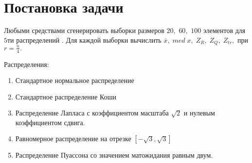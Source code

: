 \documentclass[a4]{article}
\renewcommand{\listoftables}{\begingroup %
\tocsection
\tocfile{\listtablename}{lot}
\endgroup}
\begin{document}
\newpage
\pagestyle{plain}




\newpage
\tableofcontents{}
\newpage
\listoftables{}
\newpage

\section{Постановка задачи}

Любыми средствами сгенерировать выборки размеров $20,$ $60,$ $100$ элементов для $5$ти распределений \cite{distr_formulas}. Для каждой выборки вычислить $\overline{x},\; med\; x,\; Z_R,\; Z_Q,\; Z_{tr},$ при $r = \frac{n}{4}.$

Распределения:
\begin{enumerate}
\item Стандартное нормальное распределение
\item Стандартное распределение Коши
\item Распределение Лапласа с коэффициентом масштаба $\sqrt{2}$ и нулевым коэффициентом сдвига.
\item Равномерное распределение на отрезке $\left[-\sqrt{3}, \sqrt{3}\right]$
\item Распределение Пуассона со значением матожидания равным двум.
\end{enumerate}

\begin{comment}
\begin{equation}\label{eqn:normal}
N(x,0,1) = \frac{1}{\sqrt{2\pi}}e^{-\frac{x^2}{2}}
\end{equation} 

\begin{equation}\label{eqn:cauchy}
 C(x,0,1) = \frac{1}{\pi(1+x^2)}
 \end{equation}
 
 \begin{equation}\label{eqn:laplace}
 L\left( x,0,\frac{1}{\sqrt{2}}\right) = \frac{1}{\sqrt{2}}e^{-\sqrt{2}\vert x\vert}
 \end{equation}
 
 \begin{equation}\label{eqn:poisson}
 P(\lambda,k) = \frac{\lambda^k}{k!}e^{-\lambda}
\end{equation}  

\begin{equation}\label{eqn:uniform}
M(x,-\sqrt{3}, \sqrt{3}) = 
 \begin{cases}
   \frac{1}{2\sqrt{3}} &\vert x\vert \leqslant \sqrt{3}\\
   0 &\vert x\vert > \sqrt{3}
 \end{cases}
\end{equation}
\end{comment}
\end{document}
